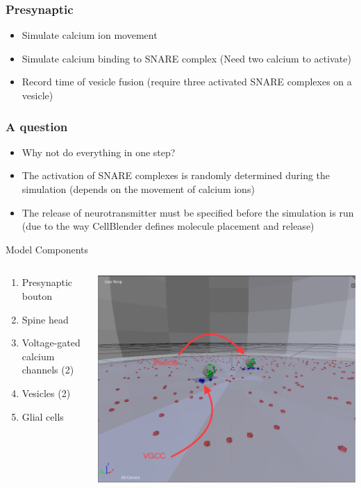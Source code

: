 \documentclass{beamer}
\begin{document}
\frame
{
    \frametitle{Presynaptic}
    \begin{itemize}
        \item Simulate calcium ion movement
        \item Simulate calcium binding to SNARE complex (Need two calcium to activate)
        \item Record time of vesicle fusion (require three activated SNARE complexes on a vesicle)
    \end{itemize}
}

\frame
{ \frametitle{A question}
    \begin{itemize}
        \item Why not do everything in one step?
        \item The activation of SNARE complexes is randomly determined during the simulation (depends on the movement of calcium ions)
        \item The release of neurotransmitter must be specified before the simulation is run (due to the way CellBlender defines molecule placement and release)
    \end{itemize}
}

\begin{frame}{Model Components}
\begin{columns}
    \begin{column}{0.47\textwidth}
\begin{enumerate} 
    \item Presynaptic bouton 
    \item Spine head
    \item Voltage-gated calcium channels (2)
    \item Vesicles (2)
    \item Glial cells
\end{enumerate}
    \end{column}
    \begin{column}{0.5\textwidth}
    \includegraphics[width=1\textwidth]{fig3.png}
    \end{column}
\end{columns}
\end{frame}
\end{document}
